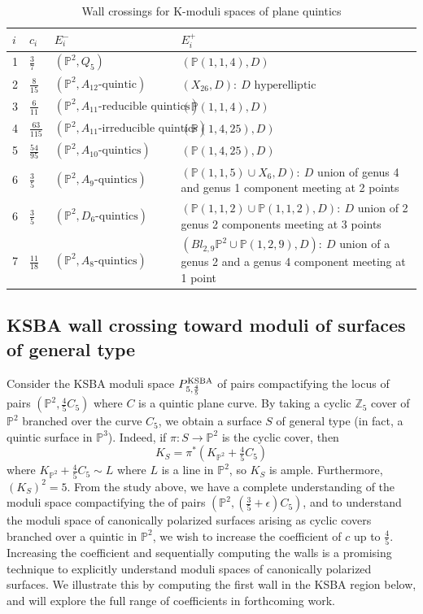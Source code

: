 \documentclass[11pt]{amsart}
\numberwithin{equation}{section}
\theoremstyle{definition}
\newcommand{\KSBA}{{\rm KSBA}}
\newcommand{\bP}{\mathbb{P}}
\newcommand{\bZ}{\mathbb{Z}}
\begin{document}
\begin{table}
 \begin{tabular}{| p{} | p{}| p{} | p{}|}\hline
       $i$ & $c_i$ & $E_i^-$ & $E_i^+$ \\ \hline
       1 & $\frac{3}{7}$ & $(\bP^2, Q_5)$ & $(\bP(1,1,4), D)$\\
       2 & $\frac{8}{15}$ & $(\bP^2, A_{12}\textrm{-quintic})$ & $(X_{26}, D): \ D \text{ hyperelliptic}$ \\
       3 & $\frac{6}{11}$ &$ (\bP^2, A_{11}\textrm{-reducible quintics})$ &       $(\bP(1,1,4), D)$ \\
       4 & $\frac{63}{115}$ & $(\bP^2, A_{11}\textrm{-irreducible quintics})$ &
        $(\bP(1,4,25), D)$\\
       5 & $\frac{54}{95}$ & $(\bP^2, A_{10}\textrm{-quintics})$ & $(\bP(1,4,25), D)$\\
       6 & $\frac{3}{5}$ & $(\bP^2, A_{9}\textrm{-quintics})$ & $(\bP(1,1,5) \cup X_6, D):\ D $ union of genus 4 and genus 1 component meeting at 2 points 
       \\
       6 & $\frac{3}{5}$ & $(\bP^2, D_{6}\textrm{-quintics})$ &  $(\bP(1,1,2) \cup \bP(1,1,2), D): \ D $ union of 2 genus 2 components meeting at 3 points \\
       7 & $\frac{11}{18}$ & $(\bP^2, A_{8}\textrm{-quintics})$ &  
       $(Bl_{2,9}\bP^2 \cup \bP(1,2,9), D): \ D $ union of a genus 2 and a genus 4 component meeting at 1 point\\
       \hline
    \end{tabular}
    
    \caption{Wall crossings for K-moduli spaces of plane quintics}
    \label{table:quintic}
\end{table}

\subsection{KSBA wall crossing toward moduli of surfaces of general type}

Consider the KSBA moduli space $P^\KSBA_{5, \frac{4}{5}}$ of pairs compactifying the locus of pairs $(\bP^2, \frac{4}{5} C_5)$ where $C$ is a quintic plane curve.  By taking a cyclic $\bZ_5$ cover of $\bP^2$ branched over the curve $C_5$, we obtain a surface $S$ of general type (in fact, a quintic surface in $\bP^3$). Indeed, if $\pi: S \to \bP^2$ is the cyclic cover, then
\[ K_S = \pi^*(K_{\bP^2} + \tfrac{4}{5} C_5)\]
where $K_{\bP^2} + \frac{4}{5} C_5 \sim L$ where $L$ is a line in $\bP^2$, so $K_S$ is ample. Furthermore, $(K_S)^2 = 5$.  From the study above, we have a complete understanding of the moduli space compactifying the of pairs $(\bP^2, (\frac{3}{5} + \epsilon)C_5)$, and to understand the moduli space of canonically polarized surfaces arising as cyclic covers branched over a quintic in $\bP^2$, we wish to increase the coefficient of $c$ up to $\frac{4}{5}$. Increasing the coefficient and sequentially computing the walls is a promising technique to explicitly understand moduli spaces of canonically polarized surfaces.  We illustrate this by computing the first wall in the KSBA region below, and will explore the full range of coefficients in forthcoming work. 
\end{document}
